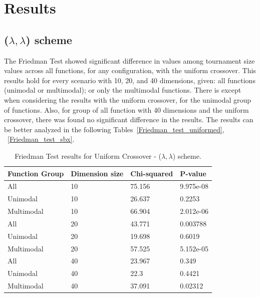 \section{Results}\label{sec:results}

\subsection{($\lambda, \lambda$) scheme}


The Friedman Test showed significant difference in values among tournament size values across all functions, for any configuration, with the uniform crossover. This results hold for every scenario with 10, 20, and 40 dimensions, given: all functions (unimodal or multimodal); or only the multimodal functions. There is except when considering the results with the uniform crossover, for the unimodal group of functions. Also, for group of all function with 40 dimensions and the uniform crossover, there was found no significant difference in the results. The results can be better analyzed in the following Tables~\ref{Friedman_test_uniformed}, ~\ref{Friedman_test_sbx}.


\begin{table}[h]
	\centering
	\begin{tabular}{|l|l|l|l|}
		\hline
		\textbf{Function Group} & \textbf{Dimension size}      & \textbf{Chi-squared}        & \textbf{P-value}                     \\ \hline
		\multicolumn{1}{|l|}{All} & \multicolumn{1}{|l|}{10} & \multicolumn{1}{l|}{75.156} & \multicolumn{1}{l|}{9.975e-08} \\ \hline
		\multicolumn{1}{|l|}{Unimodal} & \multicolumn{1}{|l|}{10} & \multicolumn{1}{l|}{26.637} & \multicolumn{1}{l|}{0.2253} \\ \hline
		\multicolumn{1}{|l|}{Multimodal} & \multicolumn{1}{|l|}{10} & \multicolumn{1}{l|}{66.904} & \multicolumn{1}{l|}{2.012e-06}  \\ \hline
		\hline
		\multicolumn{1}{|l|}{All} & \multicolumn{1}{|l|}{20} & \multicolumn{1}{l|}{43.771} & \multicolumn{1}{l|}{0.003788} \\ \hline
		\multicolumn{1}{|l|}{Unimodal} & \multicolumn{1}{|l|}{20} & \multicolumn{1}{l|}{19.698} & \multicolumn{1}{l|}{0.6019} \\ \hline
		\multicolumn{1}{|l|}{Multimodal} & \multicolumn{1}{|l|}{20} & \multicolumn{1}{l|}{57.525} & \multicolumn{1}{l|}{5.152e-05}  \\ \hline
		\hline	
		\multicolumn{1}{|l|}{All} & \multicolumn{1}{|l|}{40} & \multicolumn{1}{l|}{23.967} & \multicolumn{1}{l|}{0.349} 						\\ \hline
		\multicolumn{1}{|l|}{Unimodal} & \multicolumn{1}{|l|}{40} & \multicolumn{1}{l|}{22.3} & \multicolumn{1}{l|}{0.4421} \\ \hline
		\multicolumn{1}{|l|}{Multimodal} & \multicolumn{1}{|l|}{40} & \multicolumn{1}{l|}{37.091} & \multicolumn{1}{l|}{0.02312}  \\ \hline
	\end{tabular}
	\caption{Friedman Test results for Uniform Crossover - ($\lambda, \lambda$) scheme.}
	\label{Friedman_test_uniform}	
\end{table}


